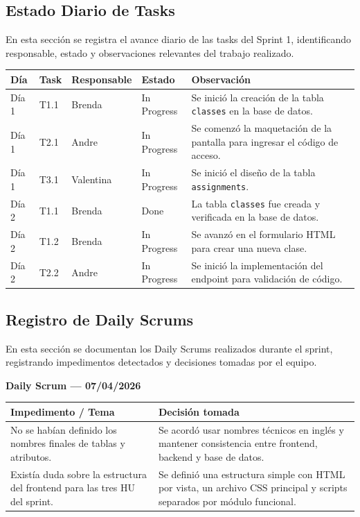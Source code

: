 \documentclass[12pt,a4paper]{article}
\begin{document}
\subsection{Estado Diario de Tasks}

En esta sección se registra el avance diario de las tasks del Sprint 1,
identificando responsable, estado y observaciones relevantes del trabajo
realizado.

\begin{longtable}{|p{1.5cm}|p{2cm}|p{2.5cm}|p{2cm}|p{5cm}|}
\hline
\textbf{Día} & \textbf{Task} & \textbf{Responsable} & \textbf{Estado} & \textbf{Observación} \\
\hline
Día 1 & T1.1 & Brenda & In Progress & Se inició la creación de la tabla \texttt{classes} en la base de datos. \\
\hline
Día 1 & T2.1 & Andre & In Progress & Se comenzó la maquetación de la pantalla para ingresar el código de acceso. \\
\hline
Día 1 & T3.1 & Valentina & In Progress & Se inició el diseño de la tabla \texttt{assignments}. \\
\hline
Día 2 & T1.1 & Brenda & Done & La tabla \texttt{classes} fue creada y verificada en la base de datos. \\
\hline
Día 2 & T1.2 & Brenda & In Progress & Se avanzó en el formulario HTML para crear una nueva clase. \\
\hline
Día 2 & T2.2 & Andre & In Progress & Se inició la implementación del endpoint para validación de código. \\
\hline
\end{longtable}


\subsection{Registro de Daily Scrums}

En esta sección se documentan los Daily Scrums realizados durante el sprint,
registrando impedimentos detectados y decisiones tomadas por el equipo.

\textbf{Daily Scrum — 07/04/2026}

\begin{longtable}{|p{6cm}|p{7cm}|}
\hline
\textbf{Impedimento / Tema} & \textbf{Decisión tomada} \\
\hline
No se habían definido los nombres finales de tablas y atributos. & Se acordó usar nombres técnicos en inglés y mantener consistencia entre frontend, backend y base de datos. \\
\hline
Existía duda sobre la estructura del frontend para las tres HU del sprint. & Se definió una estructura simple con HTML por vista, un archivo CSS principal y scripts separados por módulo funcional. \\
\hline
\end{longtable}
\end{document}
